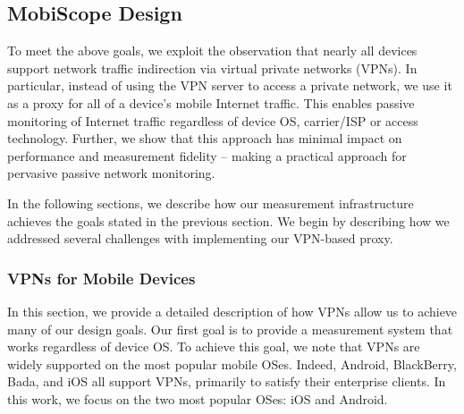 \subsection{MobiScope Design}



To meet the above goals, we exploit the observation that nearly all 
devices support network traffic indirection via virtual private networks (VPNs). 
In particular, instead of using the VPN server to access a private network, 
we use it as a proxy for all of a device's mobile Internet traffic. This enables passive monitoring 
of Internet traffic regardless of device OS, carrier/ISP or access technology. 
Further, we show that this approach has minimal impact on 
performance and measurement fidelity -- making \platname{} a practical 
approach for pervasive passive network monitoring.

In the following sections, we describe how our measurement infrastructure 
achieves the goals stated in the previous section. We begin by describing 
how we addressed several challenges with implementing our VPN-based 
proxy. 



\subsubsection{VPNs for Mobile Devices}
\label{sec:vpn-tech-mobile-device}
In this section, we provide a detailed description of how VPNs allow 
us to achieve many of our \platname{} design goals.  
Our first goal is to provide a measurement system that works regardless 
of device OS. To achieve this goal, we note that VPNs are widely supported 
on the most popular mobile OSes. Indeed, Android, BlackBerry, Bada, and iOS all support VPNs,
primarily to satisfy their enterprise clients. In this work, we focus on 
the two most popular OSes: iOS and Android. 

